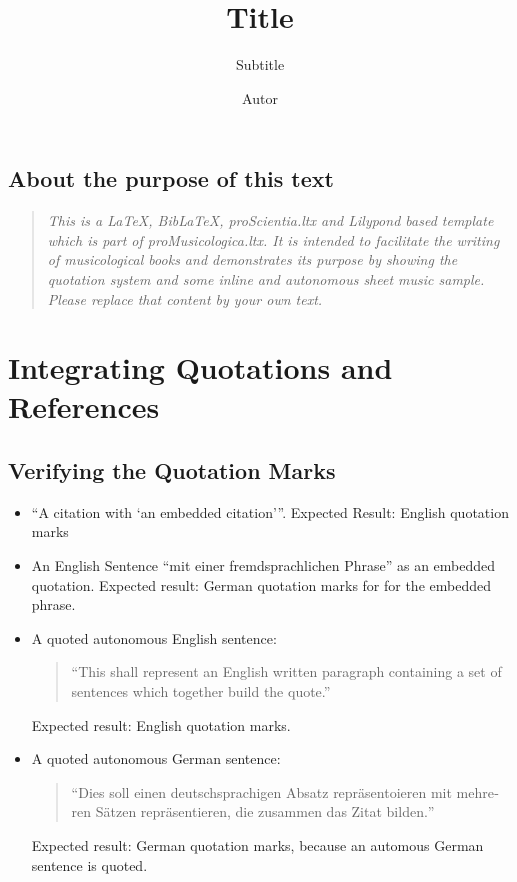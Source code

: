 \documentclass[
  DIV=calc,
  BCOR=5mm,
  11pt,
  headings=small,
  oneside,
  abstract=true,
  toc=bib,
  ngerman,english]{scrbook}
\begin{document}
\nocite{*}

\titlehead{Classification}
\subject{Release }
\title{Title}
\subtitle{Subtitle}
\author{Autor}

\maketitle
\footnotesize
\tableofcontents
\normalsize

\section{About the purpose of this text}
\begin{quote}
\itshape
This is a \emph{\LaTeX}, \emph{Bib\LaTeX}, \emph{proScientia.ltx} and \emph{Lilypond} based template which is part of \emph{proMusicologica.ltx}. It is intended to facilitate the writing of musicological books and demonstrates its purpose by showing the quotation system and some inline and autonomous sheet music sample. Please replace that content by your own text.
\end{quote}


\chapter{Integrating Quotations and References}

\section{Verifying the Quotation Marks}

\begin{itemize}

  \item \enquote{A citation with \enquote{an embedded citation}}. Expected Result: English quotation marks

  \item An English Sentence \foreignquote{german}{mit einer fremdsprachlichen Phrase} as an embedded quotation. Expected result: German quotation marks for for the embedded phrase.

  \item A quoted autonomous English sentence:
  \begin{quote}
    \enquote{This shall represent an English written paragraph containing
    a set of sentences which together build the quote.}
  \end{quote}
  Expected result: English quotation marks.

  \item A quoted autonomous German sentence:
  \begin{quote}
    \foreignquote{german}{Dies soll einen deutschsprachigen Absatz repräsentoieren mit mehreren Sätzen repräsentieren, die zusammen das Zitat bilden.}
  \end{quote}
  Expected result: German quotation marks, because an automous German sentence is quoted.
\end{itemize}
\end{document}
